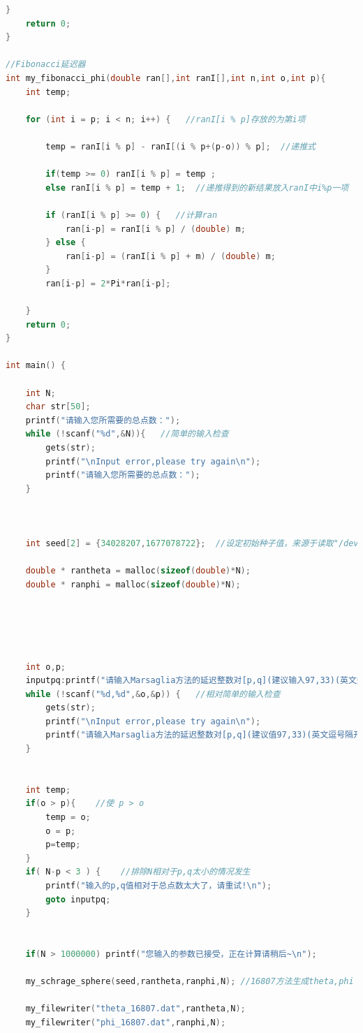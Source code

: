 \documentclass[a4paper,11pt]{article}
\begin{document}
\begin{appendices}
\begin{lstlisting}[language = C]
    }
    return 0;
}

//Fibonacci延迟器
int my_fibonacci_phi(double ran[],int ranI[],int n,int o,int p){
    int temp;

    for (int i = p; i < n; i++) {   //ranI[i % p]存放的为第i项

        temp = ranI[i % p] - ranI[(i % p+(p-o)) % p];  //递推式

        if(temp >= 0) ranI[i % p] = temp ;
        else ranI[i % p] = temp + 1;  //递推得到的新结果放入ranI中i%p一项

        if (ranI[i % p] >= 0) {   //计算ran
            ran[i-p] = ranI[i % p] / (double) m;
        } else {
            ran[i-p] = (ranI[i % p] + m) / (double) m;
        }
        ran[i-p] = 2*Pi*ran[i-p];

    }
    return 0;
}

int main() {

    int N;
    char str[50];
    printf("请输入您所需要的总点数：");
    while (!scanf("%d",&N)){   //简单的输入检查
        gets(str);
        printf("\nInput error,please try again\n");
        printf("请输入您所需要的总点数：");
    }



    int seed[2] = {34028207,1677078722};  //设定初始种子值，来源于读取"/dev/random"

    double * rantheta = malloc(sizeof(double)*N);
    double * ranphi = malloc(sizeof(double)*N);





    int o,p;
    inputpq:printf("请输入Marsaglia方法的延迟整数对[p,q](建议输入97,33)(英文逗号隔开)：");
    while (!scanf("%d,%d",&o,&p)) {   //相对简单的输入检查
        gets(str);
        printf("\nInput error,please try again\n");
        printf("请输入Marsaglia方法的延迟整数对[p,q](建议值97,33)(英文逗号隔开)：");
    }


    int temp;
    if(o > p){    //使 p > o
        temp = o;
        o = p;
        p=temp;
    }
    if( N-p < 3 ) {    //排除N相对于p,q太小的情况发生
        printf("输入的p,q值相对于总点数太大了，请重试!\n");
        goto inputpq;
    }


    if(N > 1000000) printf("您输入的参数已接受，正在计算请稍后~\n");

    my_schrage_sphere(seed,rantheta,ranphi,N); //16807方法生成theta,phi
    
    my_filewriter("theta_16807.dat",rantheta,N);
    my_filewriter("phi_16807.dat",ranphi,N);
    

\end{lstlisting}
\end{appendices}
\end{document}
